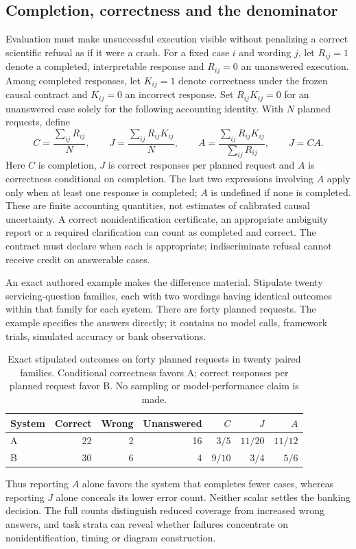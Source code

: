 \subsection{Completion, correctness and the denominator}

Evaluation must make unsuccessful execution visible without penalizing a
correct scientific refusal as if it were a crash. For a fixed case $i$ and
wording $j$, let $R_{ij}=1$ denote a completed, interpretable response and
$R_{ij}=0$ an unanswered execution. Among completed responses, let
$K_{ij}=1$ denote correctness under the frozen causal contract and
$K_{ij}=0$ an incorrect response. Set $R_{ij}K_{ij}=0$ for an unanswered
case solely for the following accounting identity. With $N$ planned
requests, define
\begin{equation}
 C=\frac{\sum_{ij}R_{ij}}{N},\qquad
 J=\frac{\sum_{ij}R_{ij}K_{ij}}{N},\qquad
 A=\frac{\sum_{ij}R_{ij}K_{ij}}{\sum_{ij}R_{ij}},
 \qquad J=CA .
 \label{exec18:framework-denominators}
\end{equation}
Here $C$ is completion, $J$ is correct responses per planned request and
$A$ is correctness conditional on completion. The last two expressions
involving $A$ apply only when at least one response is completed; $A$ is
undefined if none is completed. These are finite accounting quantities,
not estimates of calibrated causal uncertainty. A correct
nonidentification certificate, an appropriate ambiguity report or a
required clarification can count as completed and correct. The contract
must declare when each is appropriate; indiscriminate refusal cannot
receive credit on answerable cases. \citep{exec18_framework_reference}

An exact authored example makes the difference material. Stipulate twenty
servicing-question families, each with two wordings having identical
outcomes within that family for each system. There are forty planned
requests. The example specifies the answers directly; it contains no model
calls, framework trials, simulated accuracy or bank observations.
\begin{table}[htbp]
\centering
\small
\begin{tabular}{@{}lrrrrrr@{}}
\toprule
System & Correct & Wrong & Unanswered & $C$ & $J$ & $A$\\
\midrule
A & 22 & 2 & 16 & $3/5$ & $11/20$ & $11/12$\\
B & 30 & 6 & 4 & $9/10$ & $3/4$ & $5/6$\\
\bottomrule
\end{tabular}
\caption{Exact stipulated outcomes on forty planned requests in twenty
paired families. Conditional correctness favors A; correct responses per
planned request favor B. No sampling or model-performance claim is made.}
\label{exec18:framework-example}
\end{table}
Thus reporting $A$ alone favors the system that completes fewer cases,
whereas reporting $J$ alone conceals its lower error count. Neither scalar
settles the banking decision. The full counts distinguish reduced coverage
from increased wrong answers, and task strata can reveal whether failures
concentrate on nonidentification, timing or diagram construction.
\citep{exec18_framework_reference}

